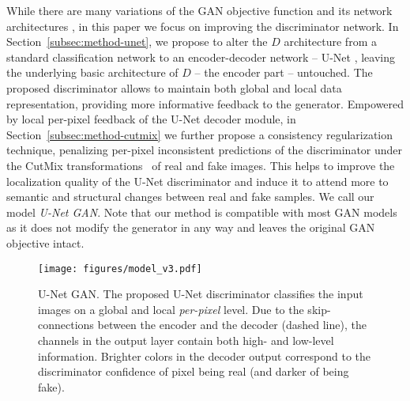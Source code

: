 \documentclass[10pt,twocolumn,letterpaper]{article}
\begin{document}
While there are many variations of the GAN objective function and its network architectures \cite{Kurach2018GANlandscape,LucicEqualGANs},
in this paper we focus on improving the discriminator network. In Section~\ref{subsec:method-unet}, we propose to alter the $D$ architecture from a standard classification network to an encoder-decoder network -- U-Net \cite{Ronneberger2015UNetCN}, leaving the underlying basic architecture of $D$ -- the encoder part -- untouched. The proposed discriminator allows to maintain both global and local data representation, providing more informative feedback to the generator.
Empowered by local per-pixel feedback of the U-Net decoder module, in Section~\ref{subsec:method-cutmix} we further propose a consistency regularization technique, penalizing per-pixel inconsistent predictions of the discriminator under the CutMix transformations~\cite{Yun2019CutMixRS} of real and fake images.
This helps to improve the localization quality of the U-Net discriminator and induce it to attend more to semantic and structural changes between real and fake samples. We call our model \emph{U-Net GAN}.
Note that our method is compatible with most GAN models as it does not modify the generator in any way and leaves the original GAN objective intact.

\begin{figure}[t]
\begin{centering}
\setlength{\tabcolsep}{0.1em}
\renewcommand{\arraystretch}{0}
\par\end{centering}
\begin{centering}
\vspace{-1em}
\hfill{}

\texttt{[image: figures/model\_v3.pdf]}
\par\end{centering}
\vspace{-0.5em}
\caption{U-Net GAN. The proposed U-Net discriminator classifies the input images on a global and local \emph{per-pixel} level. Due to the skip-connections between the encoder and the decoder (dashed line), the channels in the output layer contain both high- and low-level information. Brighter colors in the decoder output correspond to the discriminator confidence of pixel being real (and darker of being fake).}

\label{fig:method_overview}
\vspace{-0.5em}
\end{figure}
\end{document}
